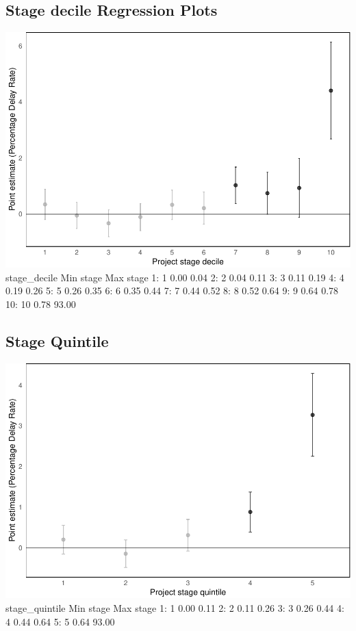 \documentclass[
]{article}
\begin{document}
\hypertarget{stage-decile-regression-plots}{%
\subsection{Stage decile Regression
Plots}\label{stage-decile-regression-plots}}

\includegraphics{qp_first_pc_delay-2_files/figure-latex/stage_decile-1.pdf}
stage\_decile Min stage Max stage 1: 1 0.00 0.04 2: 2 0.04 0.11 3: 3
0.11 0.19 4: 4 0.19 0.26 5: 5 0.26 0.35 6: 6 0.35 0.44 7: 7 0.44 0.52 8:
8 0.52 0.64 9: 9 0.64 0.78 10: 10 0.78 93.00

\hypertarget{stage-quintile}{%
\subsection{Stage Quintile}\label{stage-quintile}}

\includegraphics{qp_first_pc_delay-2_files/figure-latex/stage_quintile-1.pdf}
stage\_quintile Min stage Max stage 1: 1 0.00 0.11 2: 2 0.11 0.26 3: 3
0.26 0.44 4: 4 0.44 0.64 5: 5 0.64 93.00
\end{document}
